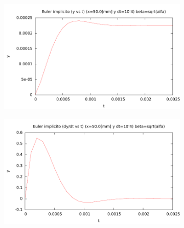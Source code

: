 \begin{center}
\begin{figure} [H]
	\begin{subfigure}[b]{0.3\textwidth}
		\includegraphics{./parte3/graficos/grafico_euler_S1_y_b1.pdf}
		\caption{} 
		\label{fig:eulerS1b1_y}
	\end{subfigure}
	
	\begin{subfigure}[b]{0.3\textwidth}
		\includegraphics{./parte3/graficos/grafico_euler_S1_dy_b1.pdf}
		\caption{} 
		\label{fig:eulerS1b1_dy}
	\end{subfigure}
\caption{} \label{euler_S1_b1}
\end{figure}
\end{center}


